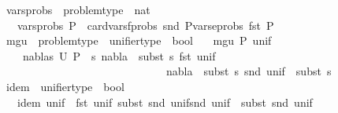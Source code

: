 \begin{isabellebody}
\isanewline
{}\isamarkupfalse%
\ vars{\isacharunderscore}{\kern0pt}probs\ {\isacharcolon}{\kern0pt}{\isacharcolon}{\kern0pt}\ {\isachardoublequoteopen}problem{\isacharunderscore}{\kern0pt}type\ {\isasymRightarrow}\ nat{\isachardoublequoteclose}\isanewline
\ \ \ {\isachardoublequoteopen}vars{\isacharunderscore}{\kern0pt}probs\ P\ {\isasymequiv}\ card{\isacharparenleft}{\kern0pt}{\isacharparenleft}{\kern0pt}vars{\isacharunderscore}{\kern0pt}fprobs\ {\isacharparenleft}{\kern0pt}snd\ P{\isacharparenright}{\kern0pt}{\isacharparenright}{\kern0pt}{\isasymunion}{\isacharparenleft}{\kern0pt}vars{\isacharunderscore}{\kern0pt}eprobs\ {\isacharparenleft}{\kern0pt}fst\ P{\isacharparenright}{\kern0pt}{\isacharparenright}{\kern0pt}{\isacharparenright}{\kern0pt}{\isachardoublequoteclose}\isanewline
\isanewline
\isanewline
\isanewline
\isanewline
{}\isamarkupfalse%
\ mgu\ {\isacharcolon}{\kern0pt}{\isacharcolon}{\kern0pt}\ {\isachardoublequoteopen}problem{\isacharunderscore}{\kern0pt}type\ {\isasymRightarrow}\ unifier{\isacharunderscore}{\kern0pt}type\ {\isasymRightarrow}\ bool{\isachardoublequoteclose}\isanewline
\ \ \ {\isachardoublequoteopen}mgu\ P\ unif\ {\isasymequiv}\ \isanewline
\ \ \ {\isasymforall}\ {\isacharparenleft}{\kern0pt}nabla{\isacharcomma}{\kern0pt}s{}{\isacharparenright}{\kern0pt}{\isasymin}\ U\ P{\isachardot}{\kern0pt}\ {\isacharparenleft}{\kern0pt}{\isasymexists}\ s{}{\isachardot}{\kern0pt}\ {\isacharparenleft}{\kern0pt}nabla\ {\isasymTurnstile}\ {\isacharparenleft}{\kern0pt}subst\ s{}{\isacharparenright}{\kern0pt}\ {\isacharparenleft}{\kern0pt}fst\ unif{\isacharparenright}{\kern0pt}{\isacharparenright}{\kern0pt}\ {\isasymand}\ \isanewline
\ \ \ \ \ \ \ \ \ \ \ \ \ \ \ \ \ \ \ \ \ \ \ \ \ \ \ \ \ \ {\isacharparenleft}{\kern0pt}nabla\ {\isasymTurnstile}\ subst\ {\isacharparenleft}{\kern0pt}s{}\ {\isasymbullet}{\isacharparenleft}{\kern0pt}snd\ unif{\isacharparenright}{\kern0pt}{\isacharparenright}{\kern0pt}\ {\isasymapprox}\ subst\ s{}{\isacharparenright}{\kern0pt}{\isacharparenright}{\kern0pt}{\isachardoublequoteclose}\isanewline
\isanewline
\isanewline
\isanewline
\isanewline
{}\isamarkupfalse%
\ idem\ {\isacharcolon}{\kern0pt}{\isacharcolon}{\kern0pt}\ {\isachardoublequoteopen}unifier{\isacharunderscore}{\kern0pt}type\ {\isasymRightarrow}\ bool{\isachardoublequoteclose}\isanewline
\ \ \ {\isachardoublequoteopen}idem\ unif\ {\isasymequiv}\ {\isacharparenleft}{\kern0pt}fst\ unif{\isacharparenright}{\kern0pt}{\isasymTurnstile}\ subst\ {\isacharparenleft}{\kern0pt}{\isacharparenleft}{\kern0pt}snd\ unif{\isacharparenright}{\kern0pt}{\isasymbullet}{\isacharparenleft}{\kern0pt}snd\ unif{\isacharparenright}{\kern0pt}{\isacharparenright}{\kern0pt}\ {\isasymapprox}\ subst\ {\isacharparenleft}{\kern0pt}snd\ unif{\isacharparenright}{\kern0pt}{\isachardoublequoteclose}\isanewline

\end{isabellebody}
